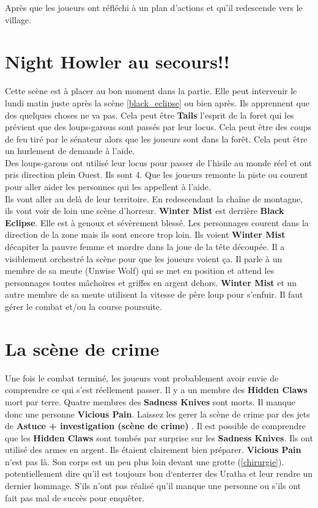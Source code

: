 \documentclass[oneside,12pt]{book}
\begin{document}
\begin{flushleft}
Après que les joueurs ont réfléchi à un plan d'actions et qu'il redescende vers le village.

\section{Night Howler au secours!!}
Cette scène est à placer au bon moment dans la partie. Elle peut intervenir le lundi matin juste  après la scène \ref{black_eclipse} ou bien après. 
Ils apprennent que des quelques choses ne va pas. Cela peut être \textbf{Tails} l'esprit de la foret qui les prévient que des loups-garous sont passés par leur locus. Cela peut être des coups de feu tiré par le sénateur alors que les joueurs sont dans la forêt. Cela peut être un hurlement de demande à l'aide. \\
Des loups-garous ont utilisé leur locus pour passer de l'hisile au monde réel et ont pris direction plein Ouest. Ils sont 4. Que les joueurs remonte la piste ou courent pour aller aider les personnes qui les appellent à l'aide. \\
Ils vont aller au delà de leur territoire. En redescendant la chaîne de montagne, ils vont voir de loin une scène d'horreur. 
\textbf{Winter Mist} est derrière \textbf{Black Eclipse}. Elle est à genoux et sévèrement blessé. Les personnages courent dans la direction de la zone mais ils sont encore trop loin. Ils voient \textbf{Winter Mist} décapiter la pauvre femme et mordre dans la joue de la tête découpée. Il a visiblement orchestré la scène pour que les joueurs voient ça. Il parle à un membre de sa meute (Unwise Wolf) qui se met en position et attend les personnages toutes mâchoires et griffes en argent dehors. \textbf{Winter Mist} et un autre membre de sa meute utilisent la vitesse de père loup pour s'enfuir. Il faut gérer le combat et/ou la course poursuite.  

\section{La scène de crime}
Une fois le combat terminé, les joueurs vont probablement avoir envie de comprendre ce qui s'est réellement passer. Il y a un membre des \textbf{Hidden Claws} mort par terre. Quatre membres des \textbf{Sadness Knives} sont morts. Il manque donc une personne \textbf{Vicious Pain}. 
Laissez les gerer la scène de crime par des jets de \textbf{Astuce + investigation (scène de crime) }. Il est possible de comprendre que les \textbf{Hidden Claws} sont tombés par surprise sur les \textbf{Sadness Knives}. Ils ont utilisé des armes en argent. Ils étaient clairement bien préparer. \textbf{Vicious Pain} n'est pas là. Son corps est un peu plus loin devant une grotte (\ref{chirurgie}). potentiellement dire qu'il est toujours bon d`enterrer des Uratha et leur rendre un dernier hommage. S'ils n'ont pas réalisé qu'il manque une personne ou s'ils ont fait pas mal de succès pour enquêter. 


\end{flushleft}
\end{document}
